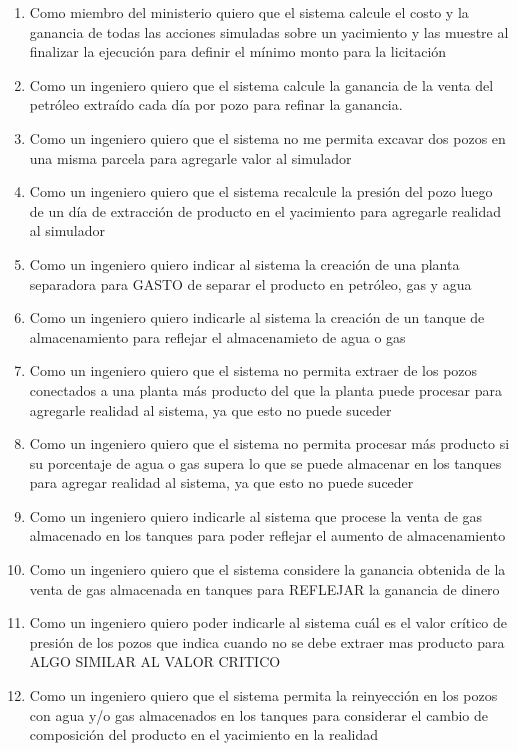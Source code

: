 \begin{enumerate}

  \item Como miembro del ministerio quiero que el sistema calcule el costo y la ganancia de todas las acciones simuladas sobre un yacimiento y las muestre al finalizar la ejecución para definir el mínimo monto para la licitación
  \item Como un ingeniero quiero que el sistema calcule la ganancia de la venta del petróleo extraído cada día por pozo para refinar la ganancia.
  \item Como un ingeniero quiero que el sistema no me permita excavar dos pozos en una misma parcela para agregarle valor al simulador
  \item Como un ingeniero quiero que el sistema recalcule la presión del pozo luego de un día de extracción de producto en el yacimiento para agregarle realidad al simulador
  \item Como un ingeniero quiero indicar al sistema la creación de una planta separadora para GASTO de separar el producto en petróleo, gas y agua
  \item Como un ingeniero quiero indicarle al sistema la creación de un tanque de almacenamiento para reflejar el almacenamieto de agua o gas
  \item Como un ingeniero quiero que el sistema no permita extraer de los pozos conectados a una planta más producto del que la planta puede procesar para agregarle realidad al sistema, ya que esto no puede suceder
  \item Como un ingeniero quiero que el sistema no permita procesar más producto si su porcentaje de agua o gas supera lo que se puede almacenar en los tanques para agregar realidad al sistema, ya que esto no puede suceder
  \item Como un ingeniero quiero indicarle al sistema que procese la venta de gas almacenado en los tanques para poder reflejar el aumento de almacenamiento
  \item Como un ingeniero quiero que el sistema considere la ganancia obtenida de la venta de gas almacenada en tanques para REFLEJAR la ganancia de dinero
  \item Como un ingeniero quiero poder indicarle al sistema cuál es el valor crítico de presión de los pozos que indica cuando no se debe extraer mas producto para ALGO SIMILAR AL VALOR CRITICO
  \item Como un ingeniero quiero que el sistema permita la reinyección en los pozos con agua y/o gas almacenados en los tanques para considerar el cambio de composición del producto en el yacimiento en la realidad

\end{enumerate}
